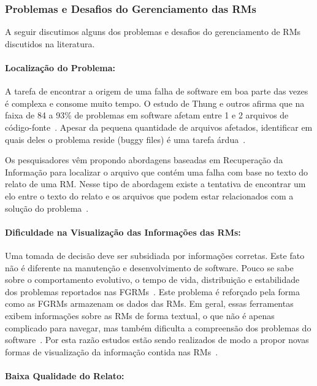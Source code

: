 \subsubsection{Problemas e Desafios do Gerenciamento das RMs}\label{ssub:problemas_relacionadas_rm}

A seguir discutimos alguns dos problemas e desafios do gerenciamento de RMs
discutidos na literatura.

\paragraph{Localização do Problema:}

A tarefa de encontrar a origem de uma falha de software em boa parte das vezes é
complexa e consome muito tempo. O estudo de Thung e outros afirma que na faixa
de 84 a 93\% de problemas em software afetam entre 1 e 2 arquivos de
código-fonte~\cite{thung2012faults}. Apesar da pequena quantidade de arquivos
afetados, identificar em quais deles o problema reside (buggy files) é uma
tarefa árdua~\cite{Thung:2014:BIT:2635868.2661678}.

Os pesquisadores vêm propondo abordagens baseadas em Recuperação da Informação
para localizar o arquivo que contém uma falha com base no texto do relato de
uma RM\@. Nesse tipo de abordagem existe a tentativa de encontrar um elo entre
o texto do relato e os arquivos que podem estar relacionados com a solução do
problema~\cite{Wong:2014:BBF:2705615.2706096}.

\paragraph{Dificuldade na Visualização das Informações das RMs:}

Uma tomada de decisão deve ser subsidiada por informações corretas. Este fato
não é diferente na manutenção e desenvolvimento de software. Pouco se sabe sobre
o comportamento evolutivo, o tempo de vida, distribuição e estabilidade dos
problemas reportados nas FGRMs~\cite{hora2012bug}. Este problema é reforçado
pela forma como as FGRMs armazenam os dados das RMs. Em geral, essas ferramentas
exibem informações sobre as RMs de forma textual, o que não é apenas complicado
para navegar, mas também dificulta a compreensão dos problemas do
software~\cite{dal2014bug}. Por esta razão estudos estão sendo realizados de
modo a propor novas formas de visualização da informação contida nas
RMs~\cite{takama2013application,hora2012bug}.

\paragraph{Baixa Qualidade do Relato:}

